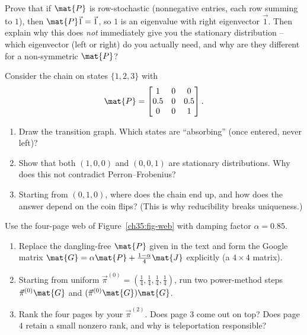 \begin{exercise}
\label{ch35:ex-perron}
Prove that if $\mat{P}$ is row-stochastic (nonnegative entries, each row summing to $1$),
then $\mat{P}\vec{1} = \vec{1}$, so $1$ is an eigenvalue with right eigenvector $\vec{1}$.
Then explain why this does \emph{not} immediately give you the stationary distribution --
which eigenvector (left or right) do you actually need, and why are they different for a
non-symmetric $\mat{P}$?
\end{exercise}

\begin{exercise}
\label{ch35:ex-reducible}
Consider the chain on states $\{1,2,3\}$ with
\[
\mat{P} = \begin{bmatrix} 1 & 0 & 0\\ 0.5 & 0 & 0.5\\ 0 & 0 & 1 \end{bmatrix}.
\]
\begin{enumerate}
\item Draw the transition graph. Which states are ``absorbing'' (once entered, never left)?
\item Show that both $(1,0,0)$ and $(0,0,1)$ are stationary distributions. Why does this not
contradict Perron--Frobenius?
\item Starting from $(0,1,0)$, where does the chain end up, and how does the answer depend on
the coin flips? (This is why reducibility breaks uniqueness.)
\end{enumerate}
\end{exercise}

\begin{exercise}
\label{ch35:ex-pagerank}
Use the four-page web of Figure~\ref{ch35:fig-web} with damping factor $\alpha = 0.85$.
\begin{enumerate}
\item Replace the dangling-free $\mat{P}$ given in the text and form the Google matrix
$\mat{G} = \alpha\mat{P} + \tfrac{1-\alpha}{4}\mat{J}$ explicitly (a $4\times4$ matrix).
\item Starting from uniform $\vec\pi^{(0)} = (\tfrac14,\tfrac14,\tfrac14,\tfrac14)$, run two
power-method steps $\vec\pi^{(0)}\mat{G}$ and $(\vec\pi^{(0)}\mat{G})\mat{G}$.
\item Rank the four pages by your $\vec\pi^{(2)}$. Does page $3$ come out on top? Does page
$4$ retain a small nonzero rank, and why is teleportation responsible?
\end{enumerate}
\end{exercise}

